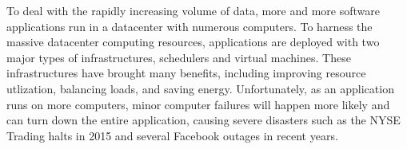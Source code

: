 
{}

To deal with the rapidly increasing volume of data, more and more software
applications run in a datacenter with numerous computers. To harness the 
massive datacenter computing resources, applications are deployed with two major 
types of infrastructures, schedulers and virtual machines. These infrastructures 
have brought many benefits, including improving resource utlization, balancing 
loads, and saving energy. Unfortunately, as an application runs on more 
computers, minor computer failures will happen more likely and can turn down 
the entire application, causing severe disasters such as the NYSE Trading halts 
in 2015 and several Facebook outages in recent years.








